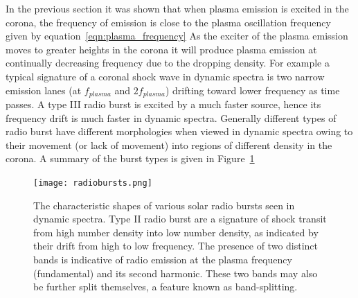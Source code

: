 In the previous section it was shown that when plasma emission is excited in the corona, the frequency of emission is close to the plasma oscillation frequency given by equation~\ref{eqn:plasma_frequency}
As the exciter of the plasma emission moves to greater heights in the corona it will produce plasma emission at continually decreasing frequency due to the dropping density. For example a typical signature of a coronal shock wave in dynamic spectra is two narrow emission lanes (at $f_{plasma}$ and $2f_{plasma}$) drifting toward lower frequency as time passes. A type III radio burst is excited by a much faster source, hence its frequency drift is much faster in dynamic spectra. Generally different types of radio burst have different morphologies when viewed in dynamic spectra owing to their movement (or lack of movement) into regions of different density in the corona. A summary of the burst types is given in Figure~\ref{fig:radiobursts}
\begin{figure}[t!]
\begin{center}
\texttt{[image: radiobursts.png]}
\caption[Solar radio burst morphologies]{The characteristic shapes of various solar radio bursts seen in dynamic spectra. Type II radio burst are a signature of shock transit from high number density into low number density, as indicated by their drift from high to low frequency. The presence of two distinct bands is indicative of radio emission at the plasma frequency (fundamental) and its second harmonic. These two bands may also be further split themselves, a feature known as band-splitting.}
\label{fig:radiobursts}
\end{center}
\end{figure}

